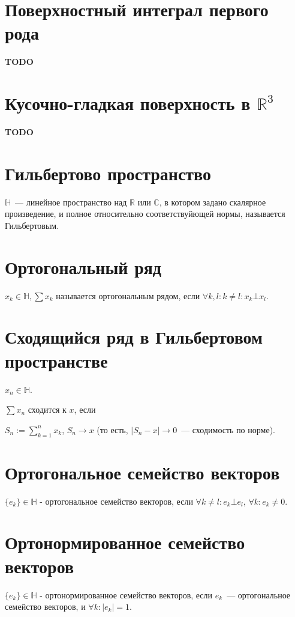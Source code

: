 \documentclass[paper=a4, fontsize=17pt]{article}
\begin{document}
	\section{Поверхностный интеграл первого рода}
	{\color{red} \textbf{TODO}}

	\section{Кусочно-гладкая поверхность в $\mathds{R}^3$}
	{\color{red} \textbf{TODO}}

	\section{Гильбертово пространство}
	$\mathds{H}$~--- линейное пространство над $\mathds{R}$ или $\mathds{C}$, в котором задано скалярное произведение, и полное относительно соответствуйющей нормы, называется Гильбертовым.

	\section{Ортогональный ряд}
	$x_k \in \mathds{H}, \sum x_k$ называется ортогональным рядом, если $\forall k, l: k \neq l: x_k \bot x_l$.

	\section{Сходящийся ряд в Гильбертовом пространстве}
	$x_n \in \mathds{H}$.

	$\sum x_n$ сходится к $x$, если

	$S_n := \sum\limits_{k = 1}^n x_k$, $S_n \rightarrow x$ (то есть, $|S_n - x| \rightarrow 0$~--- сходимость по норме).

	\section{Ортогональное семейство векторов}
	$\{e_k\} \in \mathds{H}$ - ортогональное семейство векторов, если $\forall k \neq l: e_k \bot e_l$, $\forall k: e_k \neq 0$.

	\section{Ортонормированное семейство векторов}
	$\{e_k\} \in \mathds{H}$ - ортонормированное семейство векторов, если ${e_k}$~--- ортогональное семейство векторов, и $\forall k: |e_k| = 1$.
\end{document}
